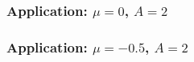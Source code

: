 \documentclass{beamer}
\begin{document}
\begin{frame}
\frametitle{Application: $\mu = 0$, $A = 2$}

\begin{figure}
\label{pic:diagram_step_0}
\end{figure}

\end{frame}


\begin{frame}
\frametitle{Application: $\mu = -0.5$, $A = 2$}

\begin{figure}
\label{pic:diagram_step_1}
\end{figure}

\end{frame}
\end{document}
